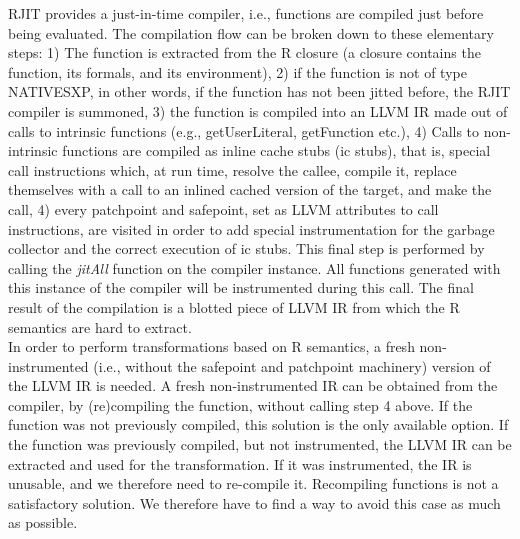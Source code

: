 RJIT provides a just-in-time compiler, i.e., functions are compiled just before being evaluated.
The compilation flow can be broken down to these elementary steps: 1) The function is extracted from the R closure (a closure contains the function, its formals, and its environment), 2) if the function is not of type NATIVESXP, in other words, if the function has not been jitted before, the RJIT compiler is summoned, 3) the function is compiled into an LLVM IR made out of calls to intrinsic functions (e.g., getUserLiteral, getFunction etc.), 4) Calls to non-intrinsic functions are compiled as inline cache stubs (ic stubs), that is, special call instructions which, at run time, resolve the callee, compile it, replace themselves with a call to an inlined cached version of the target, and make the call, 4) every patchpoint and safepoint, set as LLVM attributes\cite{llvmAttribute} to call instructions, are visited in order to add special instrumentation for the garbage collector and the correct execution of ic stubs.
This final step is performed by calling the \textit{jitAll} function on the compiler instance.
All functions generated with this instance of the compiler will be instrumented during this call.
The final result of the compilation is a blotted piece of LLVM IR from which the R semantics are hard to extract.\\

In order to perform transformations based on R semantics, a fresh non-instrumented (i.e., without the safepoint and patchpoint machinery) version of the LLVM IR is needed.
A fresh non-instrumented IR can be obtained from the compiler, by (re)compiling the function, without calling step 4 above.
If the function was not previously compiled, this solution is the only available option.
If the function was previously compiled, but not instrumented, the LLVM IR can be extracted and used for the transformation.
If it was instrumented, the IR is unusable, and we therefore need to re-compile it.
Recompiling functions is not a satisfactory solution. 
We therefore have to find a way to avoid this case as much as possible.\\

